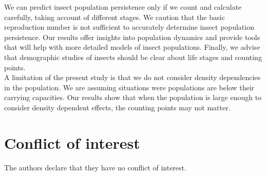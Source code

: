 \documentclass[smallextended]{svjour3}
\begin{document}
We can predict insect population persistence only if we count and calculate carefully, taking account of different stages. We caution that the basic reproduction number is not sufficient to accurately determine insect population persistence. Our results offer insights into population dynamics and provide tools that will help with more detailed models of insect populations. Finally, we advise that demographic studies of insects should be clear about life stages and counting points.\\

A limitation of the present study is that we do not consider density dependencies in the population. We are assuming situations were populations are below their carrying capacities. Our results show that when the population is large enough to consider density dependent effects, the counting points may not matter.




%
 \section*{Conflict of interest}
%
 The authors declare that they have no conflict of interest.



\nocite{*}
%
%
\end{document}
